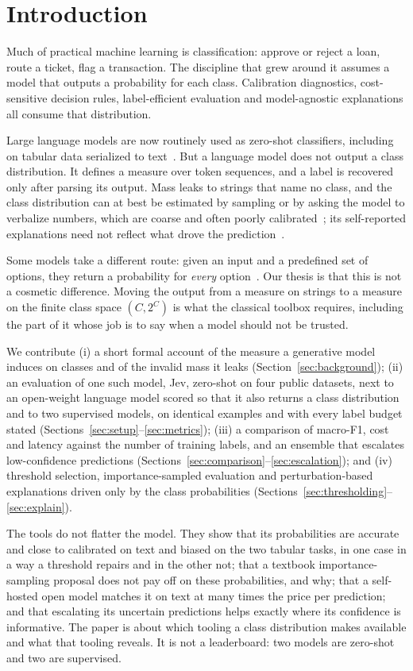 \section{Introduction}
\label{sec:intro}

Much of practical machine learning is classification: approve or reject a loan, route a ticket,
flag a transaction. The discipline that grew around it assumes a model that outputs a probability
for each class. Calibration diagnostics, cost-sensitive decision rules, label-efficient
evaluation and model-agnostic explanations all consume that distribution.

Large language models are now routinely used as zero-shot classifiers, including on tabular data
serialized to text~\citep{hegselmann2023tabllm}. But a language model does not output a class
distribution. It defines a measure over token sequences, and a label is recovered only after
parsing its output. Mass leaks to strings that name no class, and the class distribution can at
best be estimated by sampling or by asking the model to verbalize numbers, which are coarse and
often poorly calibrated~\citep{jiang2021know,tian2023justask,xiong2024uncertainty}; its
self-reported explanations need not reflect what drove the
prediction~\citep{turpin2023unfaithful}.

Some models take a different route: given an input and a predefined set of options, they return a
probability for \emph{every} option~\citep{typesafe_sdk}. Our thesis is that this is not a
cosmetic difference. Moving the output from a measure on strings to a measure on the finite class
space $(C, 2^C)$ is what the classical toolbox requires, including the part of it whose job is to
say when a model should not be trusted.

We contribute (i) a short formal account of the measure a generative model induces on classes and
of the invalid mass it leaks (Section~\ref{sec:background}); (ii) an evaluation of one such
model, Jev, zero-shot on four public datasets, next to an open-weight language model scored so
that it also returns a class distribution and to two supervised models, on identical examples and
with every label budget stated (Sections~\ref{sec:setup}--\ref{sec:metrics}); (iii) a comparison
of macro-F1, cost and latency against the number of training labels, and an ensemble that
escalates low-confidence predictions (Sections~\ref{sec:comparison}--\ref{sec:escalation}); and
(iv) threshold selection, importance-sampled evaluation and perturbation-based explanations
driven only by the class probabilities (Sections~\ref{sec:thresholding}--\ref{sec:explain}).

The tools do not flatter the model. They show that its probabilities are accurate and close to
calibrated on text and biased on the two tabular tasks, in one case in a way a threshold repairs
and in the other not; that a textbook importance-sampling proposal does not pay off on these
probabilities, and why; that a self-hosted open model matches it on text at many times the
price per prediction; and that escalating its uncertain predictions helps exactly where its
confidence is informative. The paper is about which tooling a class distribution makes available
and what that tooling reveals. It is not a leaderboard: two models are zero-shot and two are
supervised.
